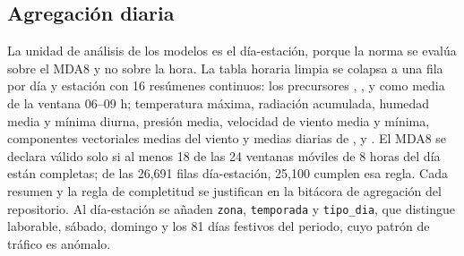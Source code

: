 \subsection{Agregación diaria}
\label{sec:agregacion-diaria}

La unidad de análisis de los modelos es el día-estación, porque la norma se
evalúa sobre el MDA8 y no sobre la hora. La tabla horaria limpia se colapsa
a una fila por día y estación con 16 resúmenes continuos: los precursores
, ,  y  como media de la ventana 06--09 h;
temperatura máxima, radiación acumulada, humedad media y mínima diurna,
presión media, velocidad de viento media y mínima, componentes vectoriales
medias del viento y medias diarias de ,  y . El
MDA8 se declara válido solo si al menos 18 de las 24 ventanas móviles de
8 horas del día están completas; de las 26,691 filas día-estación, 25,100
cumplen esa regla. Cada resumen y la regla de completitud se justifican en la
bitácora de agregación del repositorio. Al día-estación se añaden
\texttt{zona}, \texttt{temporada} y \texttt{tipo\_dia}, que distingue
laborable, sábado, domingo y los 81 días festivos del periodo, cuyo patrón de
tráfico es anómalo.
